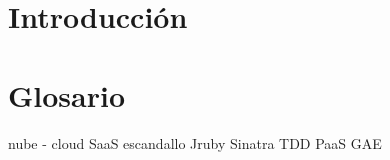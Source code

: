 \documentclass[a4paper,openright,14pt]{book}
\begin{document}
\chapter{Introducción}\label{cap.1}
\chapter{Glosario}\label{cap.glossary}

nube - cloud
SaaS
escandallo
Jruby
Sinatra
TDD
PaaS
GAE
\end{document}
